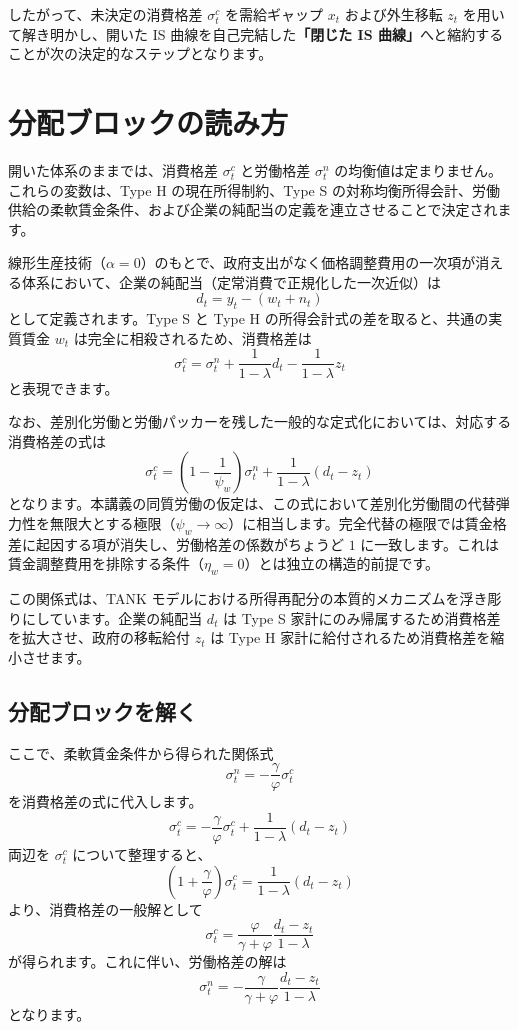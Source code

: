 \documentclass[
  japanese,
  lualatex,
  ja=standard,
  12pt,
  a4paper]{ltjsarticle}
\begin{document}
したがって、未決定の消費格差 \(\sigma_t^c\) を需給ギャップ \(x_t\)
および外生移転 \(z_t\) を用いて解き明かし、開いた IS
曲線を自己完結した\textbf{「閉じた IS
曲線」}へと縮約することが次の決定的なステップとなります。

\section{分配ブロックの読み方}\label{ux5206ux914dux30d6ux30edux30c3ux30afux306eux8aadux307fux65b9}

開いた体系のままでは、消費格差 \(\sigma_t^c\) と労働格差 \(\sigma_t^n\)
の均衡値は定まりません。これらの変数は、Type H の現在所得制約、Type S
の対称均衡所得会計、労働供給の柔軟賃金条件、および企業の純配当の定義を連立させることで決定されます。


線形生産技術（\(\alpha=0\)）のもとで、政府支出がなく価格調整費用の一次項が消える体系において、企業の純配当（定常消費で正規化した一次近似）は
\[
d_t = y_t - (w_t + n_t)
\] として定義されます。Type S と Type H
の所得会計式の差を取ると、共通の実質賃金 \(w_t\)
は完全に相殺されるため、消費格差は \[
\sigma_t^c
=
\sigma_t^n
+
\frac{1}{1-\lambda} d_t
-
\frac{1}{1-\lambda} z_t
\] と表現できます。

なお、差別化労働と労働パッカーを残した一般的な定式化においては、対応する消費格差の式は
\[
\sigma_t^c
=
\left( 1 - \frac{1}{\psi_w} \right) \sigma_t^n
+
\frac{1}{1-\lambda} (d_t - z_t)
\]
となります。本講義の同質労働の仮定は、この式において差別化労働間の代替弾力性を無限大とする極限（\(\psi_w \to \infty\)）に相当します。完全代替の極限では賃金格差に起因する項が消失し、労働格差の係数がちょうど
\(1\)
に一致します。これは賃金調整費用を排除する条件（\(\eta_w=0\)）とは独立の構造的前提です。

この関係式は、TANK
モデルにおける所得再配分の本質的メカニズムを浮き彫りにしています。企業の純配当
\(d_t\) は Type S
家計にのみ帰属するため消費格差を拡大させ、政府の移転給付 \(z_t\) は Type
H 家計に給付されるため消費格差を縮小させます。

\subsection{分配ブロックを解く}\label{ux5206ux914dux30d6ux30edux30c3ux30afux3092ux89e3ux304f}

ここで、柔軟賃金条件から得られた関係式 \[
\sigma_t^n = -\frac{\gamma}{\varphi} \sigma_t^c
\] を消費格差の式に代入します。 \[
\sigma_t^c
=
-\frac{\gamma}{\varphi} \sigma_t^c
+
\frac{1}{1-\lambda}(d_t - z_t)
\] 両辺を \(\sigma_t^c\) について整理すると、 \[
\left( 1 + \frac{\gamma}{\varphi} \right) \sigma_t^c
=
\frac{1}{1-\lambda}(d_t - z_t)
\] より、消費格差の一般解として \[
\sigma_t^c
=
\frac{\varphi}{\gamma+\varphi} \frac{d_t - z_t}{1-\lambda}
\] が得られます。これに伴い、労働格差の解は \[
\sigma_t^n
=
-\frac{\gamma}{\gamma+\varphi} \frac{d_t - z_t}{1-\lambda}
\] となります。
\end{document}
